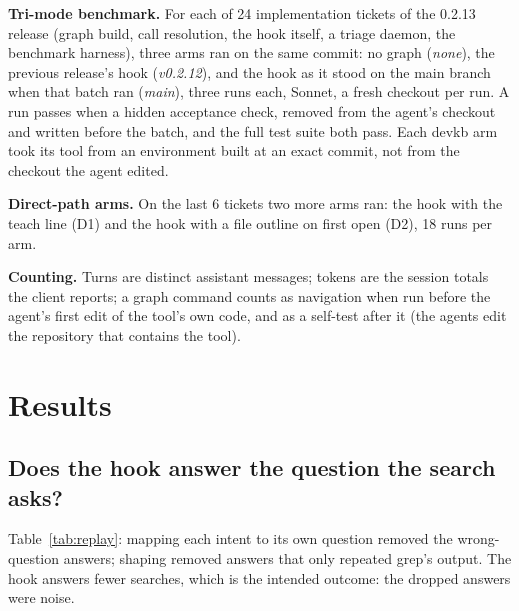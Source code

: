 \documentclass[conference]{IEEEtran}
\begin{document}
\textbf{Tri-mode benchmark.} For each of 24 implementation tickets of the 0.2.13 release (graph build, call
resolution, the hook itself, a triage daemon, the benchmark harness), three arms ran on the same commit: no graph
(\emph{none}), the previous release's hook (\emph{v0.2.12}), and the hook as it stood on the main branch when that
batch ran (\emph{main}), three runs each, Sonnet, a fresh checkout per run. A run passes when a hidden acceptance check,
removed from the agent's checkout and written before the batch, and the full test suite both pass. Each devkb arm took
its tool from an environment built at an exact commit, not from the checkout the agent edited.

\textbf{Direct-path arms.} On the last 6 tickets two more arms ran: the hook with the teach line (D1) and the hook with a
file outline on first open (D2), 18 runs per arm.

\textbf{Counting.} Turns are distinct assistant messages; tokens are the session totals the client reports; a graph
command counts as navigation when run before the agent's first edit of the tool's own code, and as a self-test after it
(the agents edit the repository that contains the tool).

\section{Results}\label{sec:results}
\subsection{Does the hook answer the question the search asks?}
\begin{table}[t]\centering\small
\caption{Replay of 973 recorded searches through each hook version.}\label{tab:replay}
\end{table}
Table~\ref{tab:replay}: mapping each intent to its own question removed the wrong-question answers; shaping removed
answers that only repeated grep's output. The hook answers fewer searches, which is the intended outcome: the dropped
answers were noise.
\end{document}
